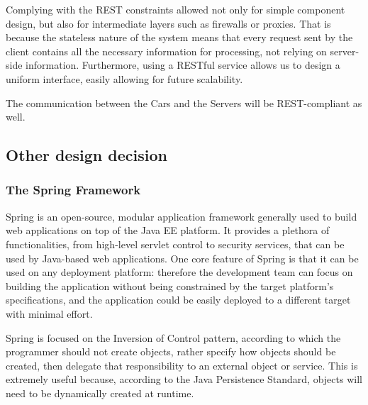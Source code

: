 \documentclass[12pt]{article}
\begin{document}
Complying with the REST constraints allowed not only for simple component design, but also for intermediate layers such as firewalls or proxies. That is because the stateless nature of the system means that every request sent by the client contains all the necessary information for processing, not relying on server-side information. Furthermore, using a RESTful service allows us to design a uniform interface, easily allowing for future scalability.

The communication between the Cars and the Servers will be REST-compliant as well.

\subsection{Other design decision}
\subsubsection{The Spring Framework} \label{Spring}
Spring is an open-source, modular application framework generally used to build web applications on top of the Java EE platform. It provides a plethora of functionalities, from high-level servlet control to security services, that can be used by Java-based web applications. One core feature of Spring is that it can be used on any deployment platform: therefore the development team can focus on building the application without being constrained by the target platform's specifications, and the application could be easily deployed to a different target with minimal effort.

Spring is focused on the Inversion of Control pattern, according to which the programmer should not create objects, rather specify how objects should be created, then delegate that responsibility to an external object or service. This is extremely useful because, according to the Java Persistence Standard, objects will need to be dynamically created at runtime.
\end{document}
